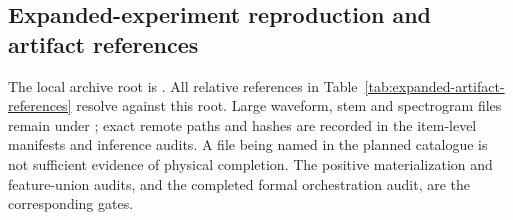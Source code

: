 \subsection{Expanded-experiment reproduction and artifact references}
\label{sec:expanded-references}

The local archive root is
.
All relative references in Table~\ref{tab:expanded-artifact-references} resolve
against this root. Large waveform, stem and spectrogram files remain under
; exact
remote paths and hashes are recorded in the item-level manifests and inference
audits. A file being named in the planned catalogue is not sufficient evidence
of physical completion. The positive materialization and feature-union audits,
and the completed formal orchestration audit, are the corresponding gates.

